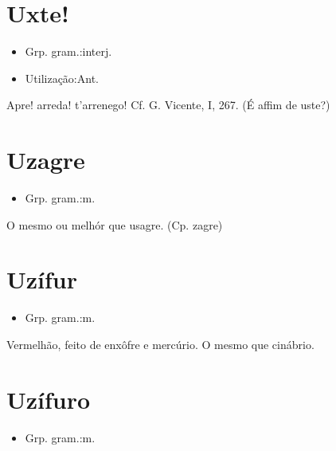 \documentclass{article}
\begin{document}
\section{Uxte!}
\begin{itemize}
\item {Grp. gram.:interj.}
\end{itemize}
\begin{itemize}
\item {Utilização:Ant.}
\end{itemize}
Apre! arreda! t'arrenego! Cf. G. Vicente, I, 267.
(É affim de \textunderscore uste\textunderscore ?)
\section{Uzagre}
\begin{itemize}
\item {Grp. gram.:m.}
\end{itemize}
O mesmo ou melhór que \textunderscore usagre\textunderscore .
(Cp. \textunderscore zagre\textunderscore )
\section{Uzífur}
\begin{itemize}
\item {Grp. gram.:m.}
\end{itemize}
Vermelhão, feito de enxôfre e mercúrio.
O mesmo que \textunderscore cinábrio\textunderscore .
\section{Uzífuro}
\begin{itemize}
\item {Grp. gram.:m.}
\end{itemize}
\end{document}
